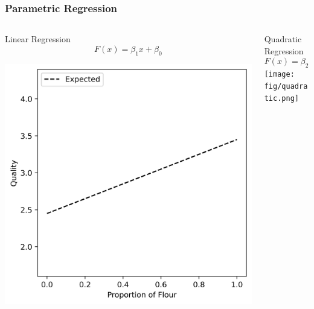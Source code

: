 \documentclass{beamer}
\begin{document}
\begin{frame}
    \frametitle{Parametric Regression}
    \begin{columns}
        \begin{column}{0.5\textwidth}
            \begin{center}
                Linear Regression
                \begin{equation*}
                    F(x) = \beta_1 x + \beta_0
                \end{equation*}

                \includegraphics[width=\textwidth]{fig/linear.png}
            \end{center}
        \end{column}
        \pause
        \begin{column}{0.5\textwidth}
            \begin{center}
                Quadratic Regression
                \begin{equation*}
                    F(x) = \beta_2 x^2 + \beta_1 x + \beta_0
                \end{equation*}
                \texttt{[image: fig/quadratic.png]}
            \end{center}
        \end{column}
    \end{columns}
\end{frame}
\end{document}
